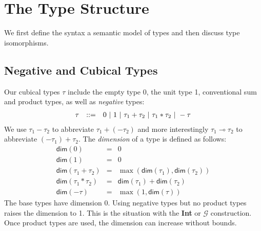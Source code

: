 \documentclass[authoryear,preprint]{sigplanconf}
\newcommand{\bdim}[1]{\textsf{dim}(#1)}
\newcommand{\lolli}{\multimap}
\begin{document}
\section{The Type Structure}

We first define the syntax a semantic model of types and then discuss type
isomorphisms.

\subsection{Negative and Cubical Types}

Our cubical types $\tau$ include the empty type 0, the unit type 1,
conventional sum and product types, as well as \emph{negative} types:
\[\begin{array}{rcl}
\tau &::=& 0 ~|~ 1 ~|~ \tau_1 + \tau_2 ~|~ \tau_1 * \tau_2 ~|~ - \tau
\end{array}\]
We use $\tau_1 - \tau_2$ to abbreviate $\tau_1 + (- \tau_2)$ and more
interestingly $\tau_1 \lolli \tau_2$ to abbreviate $(- \tau_1) + \tau_2$.
The \emph{dimension} of a type is defined as follows:
\[\begin{array}{rcl}
\bdim{0} &=& 0 \\
\bdim{1} &=& 0 \\
\bdim{\tau_1 + \tau_2} &=& \max(\bdim{\tau_1},\bdim{\tau_2}) \\
\bdim{\tau_1 * \tau_2} &=& \bdim{\tau_1} + \bdim{\tau_2} \\
\bdim{- \tau} &=& \max(1,\bdim{\tau})
\end{array}\]
The base types have dimension 0. Using negative types but no product types
raises the dimension to 1. This is the situation with the \textbf{Int} or
$\mathcal{G}$ construction. Once product types are used, the dimension can
increase without bounds.
\end{document}
